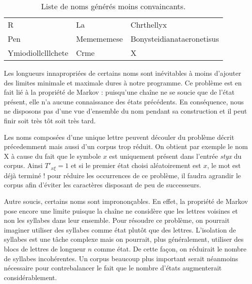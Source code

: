 \documentclass[12pt]{article}
\begin{document}
\begin{table}[H]
  \centering

  \begin{tabular}{l|l|l}
    R & La & Chrthellyx \\
    Pen & Memememese & Bonysteidianataeronetisus \\
    Ymiodiollclllchete & Crme & X
  \end{tabular}

  \caption{Liste de noms générés moins convaincants.}
  \label{pasbons}

\end{table}

Les longueurs innapropriées de certains noms sont inévitables à moins
d'ajouter des limites minimale et maximale dures à notre programme. Ce
problème est en fait lié à la propriété de Markov : puisqu'une chaîne
ne se soucie que de l'état présent, elle n'a aucune connaissance des
états précédents. En conséquence, nous ne disposons pas d'une vue
d'ensemble du nom pendant sa construction et il peut finir soit très
tôt soit très tard.

Les noms composées d'une unique lettre peuvent découler du problème
décrit précedemment mais aussi d'un corpus trop réduit. On obtient par
exemple le nom X à cause du fait que le symbole $x$ est uniquement
présent dans l'entrée \textit{styx} du corpus. Ainsi ${T'}_{x\xi} = 1$
et si le premier état choisi aléatoirement est $x$, le mot est déjà
terminé ! pour réduire les occurrences de ce problème, il faudra
agrandir le corpus afin d'éviter les caractères disposant de peu
de successeurs.

Autre soucis, certains noms sont imprononçables. En effet, la
propriété de Markov pose encore une limite puisque la chaîne ne
considère que les lettres voisines et non les syllabes dans leur
ensemble. Pour résoudre ce problème, on pourrait imaginer utiliser des
syllabes comme état plutôt que des lettres. L'isolation de syllabes
est une tâche complexe mais on pourrait, plus généralement, utiliser
des blocs de lettres de longueur $n$ comme état. De cette façon, on
réduirait le nombre de syllabes incohérentes. Un corpus beaucoup plus
important serait néanmoins nécessaire pour contrebalancer le fait que
le nombre d'états augmenterait considérablement.



\end{document}
